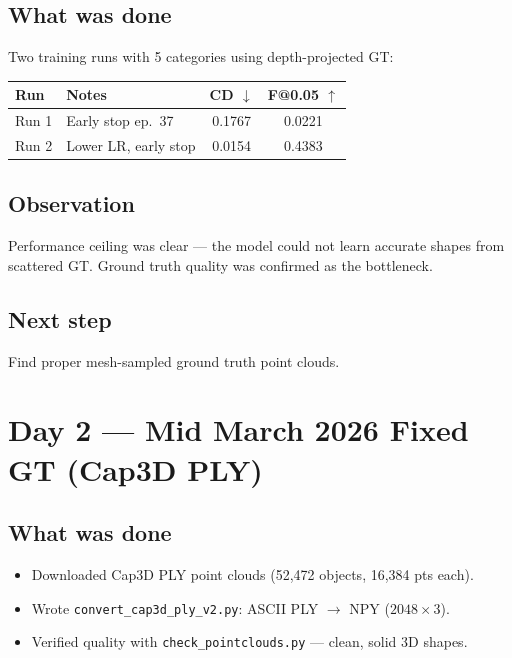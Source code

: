 \documentclass[10pt,a4paper]{article}
\begin{document}
\subsection*{What was done}
Two training runs with 5 categories using depth-projected GT:

\begin{center}
\begin{tabular}{llcc}
\toprule
\textbf{Run} & \textbf{Notes} & \textbf{CD $\downarrow$} & \textbf{F@0.05 $\uparrow$} \\
\midrule
Run 1 & Early stop ep.~37 & 0.1767 & 0.0221 \\
Run 2 & Lower LR, early stop & 0.0154 & 0.4383 \\
\bottomrule
\end{tabular}
\end{center}

\subsection*{Observation}
Performance ceiling was clear --- the model could not learn accurate shapes from scattered GT. Ground truth quality was confirmed as the bottleneck.

\subsection*{Next step}
Find proper mesh-sampled ground truth point clouds.

\section*{Day 2 --- Mid March 2026 \hfill \normalfont\small Fixed GT (Cap3D PLY)}

\subsection*{What was done}
\begin{itemize}[nosep]
    \item Downloaded Cap3D PLY point clouds (52,472 objects, 16,384 pts each).
    \item Wrote \texttt{convert\_cap3d\_ply\_v2.py}: ASCII PLY $\to$ NPY ($2048 \times 3$).
    \item Verified quality with \texttt{check\_pointclouds.py} --- clean, solid 3D shapes.
\end{itemize}
\end{document}
